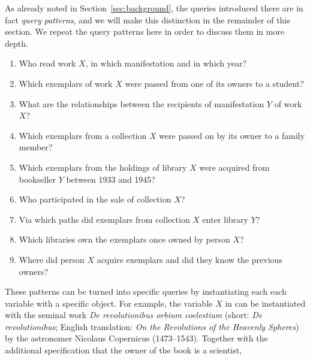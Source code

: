 As already noted in Section~\ref{sec:background}, the queries introduced there
are in fact \emph{query patterns}, and we will make this distinction in the remainder
of this section. We repeat the query patterns here in order to discuss them in more depth.
%
\begin{enumerate}
  \item[\exaquery{1}]
    Who read %
    work $X$, in which manifestation and in which year?
  \item[\exaquery{2}]
    Which exemplars
    of work $X$
    were passed from one of its owners to a student?
  \item[\exaquery{3}]
    What are the relationships between the recipients of manifestation $Y$ of work $X$?
  \item[\exaquery{4}]
    Which exemplars from a collection $X$ were passed on by its owner to a family member?
  \item[\exaquery{5}]
    Which exemplars from the holdings of library $X$ were acquired from bookseller $Y$
    between 1933 and 1945?
  \item[\exaquery{6}]
    Who participated in the sale of collection $X$?
  \item[\exaquery{7}]
    Via which paths did exemplars from collection $X$ enter library $Y$?
  \item[\exaquery{8}]
    Which libraries own the exemplars once owned by person $X$?
  \item[\exaquery{9}]
    Where did person $X$ acquire exemplars and did they know the previous owners?
\end{enumerate}
%
These patterns can be turned into specific queries by instantiating each each variable with a specific object.
For example, the variable $X$
in  can be instantiated with the seminal work \emph{De revolutionibus orbium coelestium}
(short: \emph{De revolutionibus}; English translation: \emph{On the Revolutions of the Heavenly Spheres}) \autocite{Kopernikus1543}
by the astronomer Nicolaus Copernicus (1473–1543).
Together with the additional specification that the owner of the book is a scientist,
